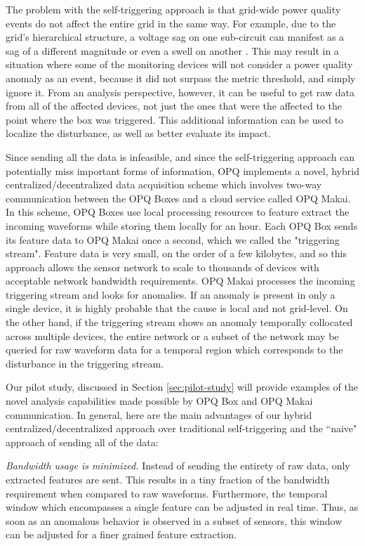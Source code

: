 The problem with the self-triggering approach is that grid-wide power quality events do not affect the entire grid in the same way. For example, due to the grid’s hierarchical structure, a voltage sag on one sub-circuit can manifest as a sag of a different magnitude or even a swell on another \cite{kahle_power_2015}. This may result in a situation where some of the monitoring devices will not consider a power quality anomaly as an event, because it did not surpass the metric threshold, and simply ignore it. From an analysis perspective, however, it can be useful to get raw data from all of the affected devices, not just the ones that were the affected to the point where the box was triggered. This additional information can be used to localize the disturbance, as well as better evaluate its impact.

Since sending all the data is infeasible, and since the self-triggering approach can potentially miss important forms of information, OPQ implements a novel, hybrid centralized/decentralized data acquisition scheme which involves two-way communication between the OPQ Boxes and a cloud service called OPQ Makai. In this scheme, OPQ Boxes use local processing resources to feature extract the incoming waveforms while storing them locally for an hour. Each OPQ Box sends its feature data to OPQ Makai once a second, which we called the "triggering stream". Feature data is very small, on the order of a few kilobytes, and so this approach allows the sensor network to scale to thousands of devices with acceptable network bandwidth requirements.  OPQ Makai processes the incoming triggering stream and looks for anomalies. If an anomaly is present in only a single device, it is highly probable that the cause is local and not grid-level. On the other hand, if the triggering stream shows an anomaly temporally collocated across multiple devices, the entire network or a subset of the network may be queried for raw waveform data for a temporal region which corresponds to the disturbance in the triggering stream.

Our pilot study, discussed in Section \ref{sec:pilot-study} will provide examples of the novel analysis capabilities made possible by OPQ Box and OPQ Makai communication. In general, here are the main advantages of our hybrid centralized/decentralized approach over traditional self-triggering and the ``naive" approach of sending all of the data:

{\em Bandwidth usage is minimized.} Instead of sending the entirety of raw data, only extracted features are sent. This results in a tiny fraction of the bandwidth requirement when compared to raw waveforms. Furthermore, the temporal window which encompasses a single feature can be adjusted in real time. Thus, as soon as an anomalous behavior is observed in a subset of sensors, this window can be adjusted for a finer grained feature extraction.

